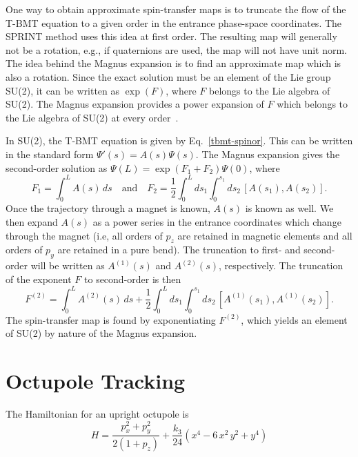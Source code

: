 One way to obtain approximate spin-transfer maps is to truncate the flow of the T-BMT equation to a given order in the entrance phase-space coordinates.
The SPRINT method  uses this idea at first order. The resulting map will generally not be a rotation, e.g., if quaternions are used, the map will
not have unit norm. The idea behind the Magnus expansion is to find an approximate map which is also a rotation. Since the exact solution must be an
element of the Lie group SU(2), it can be written as $\exp(F)$, where $F$ belongs to the Lie algebra of SU(2). The Magnus expansion provides a power
expansion of $F$ which belongs to the Lie algebra of SU(2) at every order~\cite{b:magnus}.

In SU(2), the T-BMT equation is given by Eq.~\eqref{tbmt-spinor}. This can be written in the standard form $\Psi'(s)=A(s)\Psi(s)$. The Magnus expansion gives the second-order solution as $\Psi(L)=\exp(F_1+F_2)\Psi(0)$, where
\begin{equation}
F_1 = \int_0^LA(s)\,ds \quad \mathrm{and} \quad F_2=\frac{1}{2}\int_0^Lds_1\int_0^{s_1}ds_2\,[A(s_1),A(s_2)].
\end{equation}
Once the trajectory through a magnet is known, $A(s)$ is known as well. We then expand $A(s)$ as a power series in the entrance coordinates which change through the magnet (i.e, all orders of $p_z$ are retained in magnetic elements and all orders of $p_y$ are retained in a pure bend). The truncation to first- and second-order will be written as $A^{(1)}(s)$ and $A^{(2)}(s)$, respectively. The truncation of the exponent $F$ to second-order is then
\begin{equation}
F^{(2)}=\int_0^LA^{(2)}(s)\,ds+\frac{1}{2}\int_0^Lds_1\int_0^{s_1}ds_2\,[A^{(1)}(s_1),A^{(1)}(s_2)].
\end{equation}
The spin-transfer map is found by exponentiating $F^{(2)}$, which yields an element of SU(2) by nature of the Magnus expansion.


\section{Octupole Tracking}
\label{s:octupole.std}

The Hamiltonian for an upright octupole is
\begin{equation}
  H = \frac{p_x^2 + p_y^2}{2 (1 + p_z)} + \frac{k_3}{24} (x^4 - 6 \, x^2 \, y^2 + y^4)
\end{equation}

